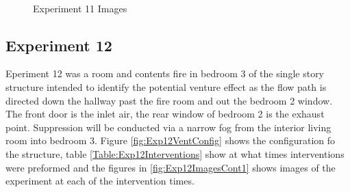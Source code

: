 \documentclass{article}
\begin{document}
\begin{figure}[H]
	\ContinuedFloat 
	\centering 
	 \ 
	 \ 
	\caption{Experiment 11 Images}
	\label{fig:Experiment11ImagesCont3} 
\end{figure}

\subsection{Experiment 12}
Eperiment 12 was a room and contents fire in bedroom 3 of the single story structure intended to identify the potential venture effect as the flow path is directed down the hallway past the fire room and out the bedroom 2 window. The front door is the inlet air, the rear window of bedroom 2 is the exhaust point. Suppression will be conducted via a narrow fog from the interior living room into bedroom 3. Figure \ref{fig:Exp12VentConfig} shows the configuration fo the structure, table \ref{Table:Exp12Interventions} show at what times interventions were preformed and the figures in \ref{fig:Exp12ImagesCont1} shows images of the experiment at each of the intervention times.
\end{document}

